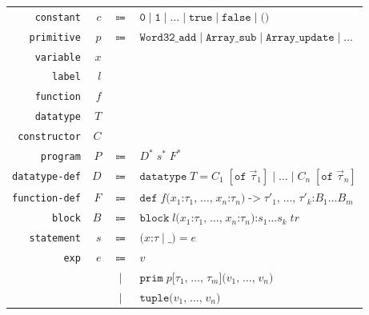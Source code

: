 
\begin{figure}[htbp]
  \centering
  \small
  \begin{tabular}{@{}r@{\quad}r@{\;}c@{\;}l@{}}
    \texttt{constant}    & $c$   & $\Coloneqq$ & $\texttt{0} \mid \texttt{1} \mid \dots \mid \texttt{true} \mid \texttt{false} \mid \texttt{()}$ \\
    \texttt{primitive}   & $p$   & $\Coloneqq$ & $\texttt{Word32\_add} \mid \texttt{Array\_sub} \mid \texttt{Array\_update} \mid \dots$ \\
    \texttt{variable}    & $x$   &             & \\
    \texttt{label}       & $l$   &             & \\
    \texttt{function}    & $f$   &             & \\
    \texttt{datatype}    & $T$   &             & \\
    \texttt{constructor} & $C$   &             & \\[0.6em]
    \texttt{program}     & $P$   & $\Coloneqq$ & $D^* \; s^* \; F^*$ \\
    \texttt{datatype-def}& $D$   & $\Coloneqq$ & $\texttt{datatype}\; T \mathrel{\texttt{=}} C_1\;[\texttt{of}\;\vec{\tau}_1] \mathrel{\texttt{|}} \dots \mathrel{\texttt{|}} C_n\;[\texttt{of}\;\vec{\tau}_n]$ \\
    \texttt{function-def}& $F$   & $\Coloneqq$ & $\texttt{def}\; f\texttt{(}x_1 \mathbin{\texttt{:}} \tau_1\texttt{,}\;\dots\texttt{,}\;x_n \mathbin{\texttt{:}} \tau_n\texttt{)} \mathrel{\texttt{->}} \tau'_1\texttt{,}\;\dots\texttt{,}\;\tau'_k \mathbin{\texttt{:}} B_1 \dots B_m$ \\
    \texttt{block}       & $B$   & $\Coloneqq$ & $\texttt{block}\; l\texttt{(}x_1 \mathbin{\texttt{:}} \tau_1\texttt{,}\;\dots\texttt{,}\;x_n \mathbin{\texttt{:}} \tau_n\texttt{)} \mathbin{\texttt{:}} s_1 \dots s_k \; tr$ \\
    \texttt{statement}   & $s$   & $\Coloneqq$ & $\texttt{(}x \mathbin{\texttt{:}} \tau \mid \texttt{\_}\texttt{)} \mathrel{\texttt{=}} e$ \\[0.4em]
    \texttt{exp}         & $e$   & $\Coloneqq$ & $v$ \\
                         &       & $\mid$      & $\texttt{prim}\; p\texttt{[}\tau_1\texttt{,}\;\dots\texttt{,}\;\tau_m\texttt{](}v_1\texttt{,}\;\dots\texttt{,}\;v_n\texttt{)}$ \\
                         &       & $\mid$      & $\texttt{tuple(}v_1\texttt{,}\;\dots\texttt{,}\;v_n\texttt{)}$ \\

\end{tabular}
\end{figure}
